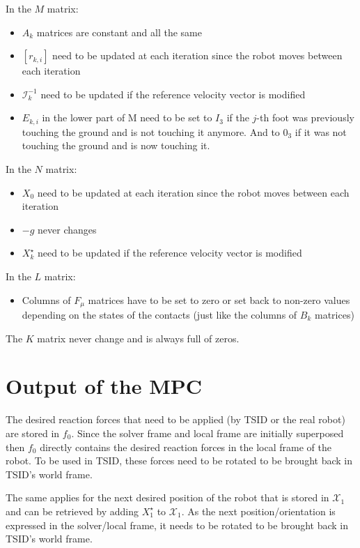\documentclass[a4paper,11pt]{article}
\begin{document}
In the $M$ matrix:
\begin{itemize}
\item $A_k$ matrices are constant and all the same
\item $[r_{k,i}]$ need to be updated at each iteration since the robot moves between each iteration
\item $\mathcal{I}_k^{-1}$ need to be updated if the reference velocity vector is modified
\item $E_{k,i}$ in the lower part of M need to be set to $I_3$ if the $j$-th foot was previously touching the ground and is not touching it anymore. And to $0_3$ if it was not touching the ground and is now touching it.
\end{itemize}

In the $N$ matrix:
\begin{itemize}
	\item $X_0$ need to be updated at each iteration since the robot moves between each iteration
	\item $- g$ never changes
	\item $X_k^\star$ need to be updated if the reference velocity vector is modified
\end{itemize}

In the $L$ matrix:
\begin{itemize}
	\item Columns of $F_\mu$ matrices have to be set to zero or set back to non-zero values depending on the states of the contacts (just like the columns of $B_k$ matrices)
\end{itemize}

The $K$ matrix never change and is always full of zeros.

\section*{Output of the MPC}

The desired reaction forces that need to be applied (by TSID or the real robot) are stored in $f_0$. Since the solver frame and local frame are initially superposed then $f_0$ directly contains the desired reaction forces in the local frame of the robot. To be used in TSID, these forces need to be rotated to be brought back in TSID's world frame. 

The same applies for the next desired position of the robot that is stored in $\mathcal{X}_1$ and can be retrieved by adding $X_1^\star$ to $\mathcal{X}_1$. As the next position/orientation is expressed in the solver/local frame, it needs to be rotated to be brought back in TSID's world frame.
\end{document}
